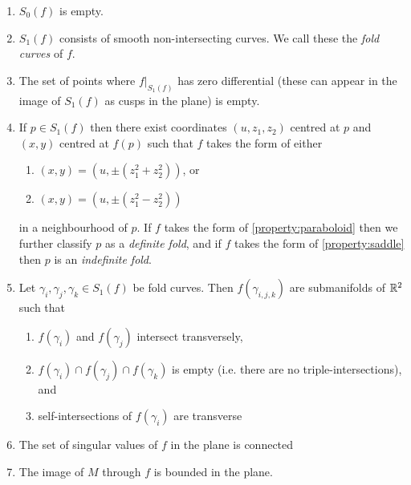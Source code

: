 \begin{enumerate}
	\item $S_0(f)$ is empty.
	
	\item $S_1(f)$ consists of smooth non-intersecting curves.  We call these the \emph{fold curves} of $f$.
	
	\item The set of points where $f|_{S_1(f)}$ has zero differential (these can appear in the image of $S_1(f)$ as cusps in the plane) is empty.
	
	\item\label{strat-con:fold-type} If $p\in S_1(f)$ then there exist coordinates $(u, z_1, z_2)$ centred at $p$ and $(x,y)$ centred at $f(p)$ such that $f$ takes the form of either
	\begin{enumerate}
		\item\label{property:paraboloid} $(x,y)=(u,\pm(z_1^2+z_2^2))$, or
		\item\label{property:saddle} $(x,y)=(u,\pm(z_1^2-z_2^2))$
	\end{enumerate}
	in a neighbourhood of $p$.
	If $f$ takes the form of \ref{property:paraboloid} then we further classify $p$ as a \emph{definite fold}, and if $f$ takes the form of \ref{property:saddle} then $p$ is an \emph{indefinite fold}.
	
	\item Let $\gamma_i, \gamma_j, \gamma_k \in S_1(f)$ be fold curves. Then $f(\gamma_{i,j,k})$ are submanifolds of $\mathbb{R}^2$ such that
	\begin{enumerate}
		\item $f(\gamma_i)$ and $f(\gamma_j)$ intersect transversely,
		
		\item $f(\gamma_i)\cap f(\gamma_j)\cap f(\gamma_k)$ is empty (i.e. there are no triple-intersections), and
		
		\item self-intersections of $f(\gamma_i)$ are transverse
	\end{enumerate}
	
	\item The set of singular values of $f$ in the plane is connected
	
	\item The image of $M$ through $f$ is bounded in the plane.
	
\end{enumerate}

